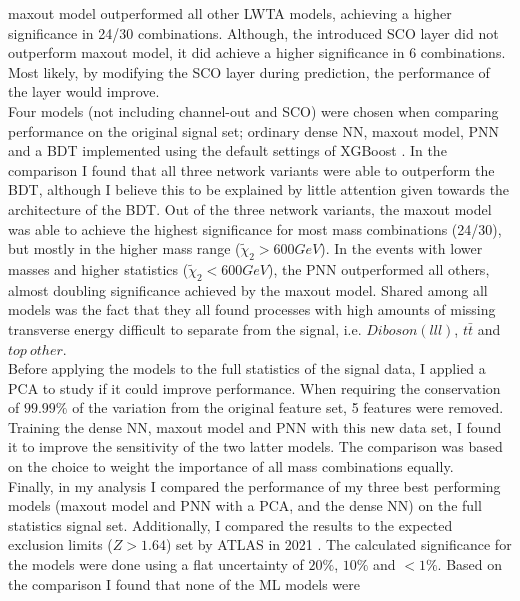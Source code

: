maxout model outperformed all other \ac{LWTA} models, achieving a higher significance in 24/30 combinations. Although, the introduced \ac{SCO} layer did not outperform maxout model, it did achieve a higher significance in 6 
combinations. Most likely, by modifying the \ac{SCO} layer during prediction, the performance of the layer would improve.
\\\newline
Four models (not including channel-out and \ac{SCO}) were chosen when comparing performance on the original signal set; ordinary dense \ac{NN}, maxout model, \ac{PNN} and a \ac{BDT} implemented using the default settings of XGBoost \cite{XGB}. In the comparison I found that 
all three network variants were able to outperform the \ac{BDT}, although I believe this to be explained by little attention given towards the architecture of the \ac{BDT}. Out of the three network variants, the maxout model was able to achieve 
the highest significance for most mass combinations (24/30), but mostly in the higher mass range ($\tilde{\chi}_2>600GeV$). In the events with lower masses and higher statistics ($\tilde{\chi}_2<600GeV$), the \ac{PNN} outperformed all others, 
almost doubling significance achieved by the maxout model. Shared among all models was the fact that they all found processes with high amounts of missing transverse energy difficult to separate from the signal, i.e. $Diboson(lll)$, $t\bar{t}$ and $top\ other$.
\\\newline
Before applying the models to the full statistics of the signal data, I applied a \ac{PCA} to study if it could improve performance. When requiring the conservation of $99.99\%$ of the variation from the original feature set, 5 features were removed.
Training the dense \ac{NN}, maxout model and \ac{PNN} with this new data set, I found it to improve the sensitivity of the two latter models. The comparison was based on the choice to weight the importance of all mass combinations equally.
\\\newline
Finally, in my analysis I compared the performance of my three best performing models (maxout model and \ac{PNN} with a \ac{PCA}, and the dense \ac{NN}) on the full statistics signal set. Additionally, I compared the results to the expected exclusion 
limits ($Z>1.64$) set by \ac{ATLAS} in 2021 \cite{atlas_search_2021}. The calculated significance for the models were done using a flat uncertainty of $20\%$, $10\%$ and $<1\%$. Based on the comparison I found that none of the \ac{ML} models were 
